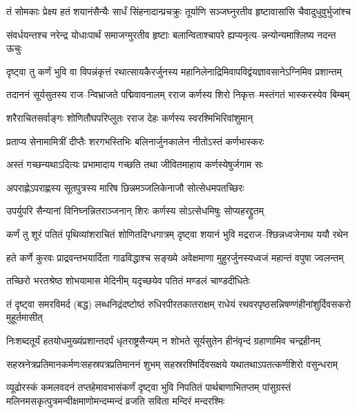 \twolineshloka
{तं सोमकाः प्रेक्ष्य हतं शयानंसैन्यैः सार्धं सिंहनादान्प्रचक्रुः}
{तूर्याणि सञ्जघ्नुरतीव हृष्टावासांसि चैवादुधुवुर्भुजांश्च}


\twolineshloka
{संवर्धयन्तश्च नरेन्द्र योधाःपार्थं समाजग्मुरतीव हृष्टाः}
{बलान्विताश्चापरे ह्यप्यनृत्य--न्नन्योन्यमाश्लिष्य नदन्त ऊचुः}


\twolineshloka
{दृष्ट्वा तु कर्णं भुवि वा विपन्नंकृत्तं रथात्सायकैरर्जुनस्य}
{महानिलेनाद्रिमिवापविद्वंयज्ञावसानेऽग्निमिव प्रशान्तम्}


\twolineshloka
{तदाननं सूर्यसुतस्य राज--न्विभ्राजते पद्मिवावनालम्}
{रराज कर्णस्य शिरो निकृत्त--मस्तंगतं भास्करस्येव बिम्बम्}


\twolineshloka
{शरैराचितसर्वाङ्गः शोणितौघपरिप्लुतः}
{रराज देहः कर्णस्य स्वरश्मिभिरिवांशुमान्}


\twolineshloka
{प्रताप्य सेनामामित्रीं दीप्तैः शरगभस्तिभिः}
{बलिनार्जुनकालेन नीतोऽस्तं कर्णभास्करः}


\twolineshloka
{अस्तं गच्छन्यथाऽदित्यः प्रभामादाय गच्छति}
{तथा जीवितमाहाय कर्णस्येषुर्जगाम सः}


\twolineshloka
{अपराह्णेऽपराह्णस्य सूतपुत्रस्य मारिष}
{छिन्नमञ्जलिकेनाजौ सोत्सेधमपतच्छिरः}


\twolineshloka
{उपर्युपरि सैन्यानां विनिघ्नन्नितराञ्जनान्}
{शिरः कर्णस्य सोऽत्सेधमिषुः सोप्यहरद्द्रुतम्}


\twolineshloka
{कर्णं तु शूरं पतितं पृथिव्यांशराचितं शोणितदिग्धगात्रम्}
{दृष्ट्वा शयानं भुवि मद्रराज--श्छिन्नध्वजेनाथ ययौ रथेन}


\twolineshloka
{हते कर्णे कुरवः प्राद्रवन्तभयार्दिता गाढविद्धाश्च सङ्ख्ये}
{अवेक्षमाणा मुहुरर्जुनस्यध्वजं महान्तं वपुषा ज्वलन्तम्}


\twolineshloka
{तच्छिरो भरतश्रेष्ठ शोभयामास मेदिनीम्}
{यदृच्छयेव पतितं मण्डलं चाण्डदीधितेः}


\twolineshloka
{तं दृष्ट्वा समरविमर्द (बद्ध) लब्धनिद्रंदष्टोष्ठं रुधिरपीरतकातराक्षम्}
{राधेयं रथवरपृष्ठसन्निषण्णंहीनांशुर्दिवसकरो मुहूर्तमासीत्}


\twolineshloka
{निःशब्दतूर्यं हतयोधमुख्यंप्रशान्तदर्पं धृतराष्ट्रसैन्यम्}
{न शोभते सूर्यसुतेन हीनंवृन्दं ग्रहाणामिव चन्द्रहीनम्}


\twolineshloka
{सहस्रनेत्रप्रतिमानकर्मणःसहस्रपत्रप्रतिमाननं शुभम्}
{सहस्ररश्मिर्दिवसक्षये यथातथाऽपतत्कर्णशिरो वसुन्धराम्}


\twolineshloka
{व्यूढोरस्कं कमलवदनं तप्तहेमावभासंकर्णं दृष्ट्वा भुवि निपतितं पार्थबाणाभितप्तम्}
{पांसुग्रस्तं मलिनमसकृत्पुत्रमन्वीक्षमाणोमन्दम्मन्दं व्रजति सविता मन्दिरं मन्दरश्मिः}


